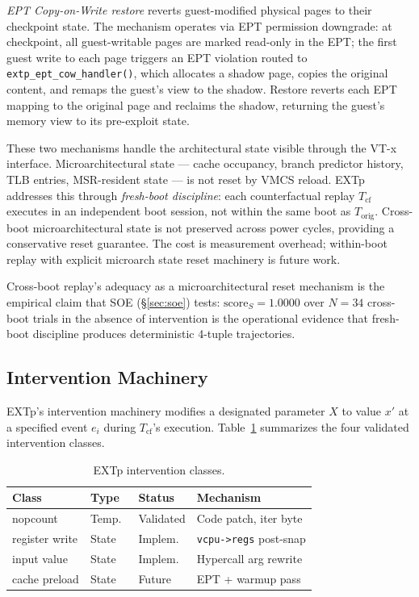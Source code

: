 \documentclass[conference]{IEEEtran}
\newcommand{\Korig}{T_\text{orig}}
\newcommand{\Tcf}{T_\text{cf}}
\newcommand{\scoreS}{\text{score}_S}
\begin{document}
\emph{EPT Copy-on-Write restore} reverts guest-modified physical
pages to their checkpoint state. The mechanism operates via EPT
permission downgrade: at checkpoint, all guest-writable pages are
marked read-only in the EPT; the first guest write to each page
triggers an EPT violation routed to
\texttt{extp\_ept\_cow\_handler()}, which allocates a shadow page,
copies the original content, and remaps the guest's view to the
shadow. Restore reverts each EPT mapping to the original page and
reclaims the shadow, returning the guest's memory view to its
pre-exploit state.

These two mechanisms handle the architectural state visible through
the VT-x interface. Microarchitectural state --- cache occupancy,
branch predictor history, TLB entries, MSR-resident state --- is not
reset by VMCS reload. EXTp addresses this through \emph{fresh-boot
discipline}: each counterfactual replay $\Tcf$ executes in an
independent boot session, not within the same boot as $\Korig$.
Cross-boot microarchitectural state is not preserved across power
cycles, providing a conservative reset guarantee. The cost is
measurement overhead; within-boot replay with explicit microarch
state reset machinery is future work.

Cross-boot replay's adequacy as a microarchitectural reset mechanism
is the empirical claim that SOE (\S\ref{sec:soe}) tests:
$\scoreS = 1.0000$ over $N{=}34$ cross-boot trials in the absence of
intervention is the operational evidence that fresh-boot discipline
produces deterministic 4-tuple trajectories.

\subsection{Intervention Machinery}\label{sec:intervention}

EXTp's intervention machinery modifies a designated parameter $X$ to
value $x'$ at a specified event $e_i$ during $\Tcf$'s execution.
Table~\ref{tab:interventions} summarizes the four validated
intervention classes.

\begin{table}[t]
  \caption{EXTp intervention classes.}
  \label{tab:interventions}
  \centering
  \small
  \begin{tabular}{@{}p{}p{}p{}p{}@{}}
  \toprule
  Class & Type & Status & Mechanism \\
  \midrule
  nopcount       & Temp.\ & Validated   & Code patch, iter byte \\
  register write & State  & Implem.\    & \texttt{vcpu->regs} post-snap \\
  input value    & State  & Implem.\    & Hypercall arg rewrite \\
  cache preload  & State  & Future      & EPT + warmup pass \\
  \bottomrule
  \end{tabular}
\end{table}
\end{document}
